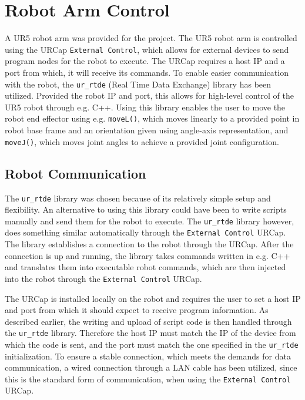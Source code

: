 \section{Robot Arm Control}
A UR5 robot arm was provided for the project. The UR5 robot arm is controlled using the URCap \texttt{External Control}, which allows for external devices to send program nodes for the robot to execute. The URCap requires a host IP and a port from which, it will receive its commands.
To enable easier communication with the robot, the \texttt{ur\_rtde} (Real Time Data Exchange) library\cite{10871000} has been utilized. Provided the robot IP and port, this allows for high-level control of the UR5 robot through e.g. C++. Using this library enables the user to move the robot end effector using e.g. \texttt{moveL()}, which moves linearly to a provided point in robot base frame and an orientation given using angle-axis representation, and \texttt{moveJ()}, which moves joint angles to achieve a provided joint configuration.

\subsection{Robot Communication}

The \texttt{ur\_rtde} library was chosen because of its relatively simple setup and flexibility. 
An alternative to using this library could have been to write scripts manually and send them for the robot to execute. 
The \texttt{ur\_rtde} library however, does something similar automatically through the \texttt{External Control} URCap. The library establishes a connection to the robot through the URCap. After the connection is up and running, the library takes commands written in e.g. C++ and translates them into executable robot commands, which are then injected into the robot through the \texttt{External Control} URCap.


The URCap is installed locally on the robot and requires the user to set a host IP and port from which it should expect to receive program information. As described earlier, the writing and upload of script code is then handled through the \texttt{ur\_rtde} library. Therefore the host IP must match the IP of the device from which the code is sent, and the port must match the one specified in the \texttt{ur\_rtde} initialization. To ensure a stable connection, which meets the demands for data communication, a wired connection through a LAN cable has been utilized, since this is the standard form of communication, when using the \texttt{External Control} URCap.

